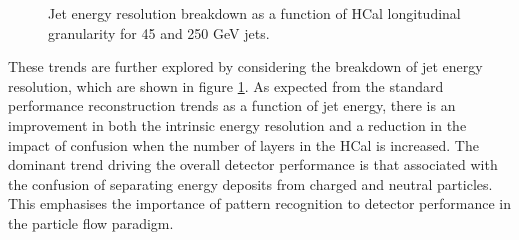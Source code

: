 \begin{figure}
\centering
{}
\caption[Jet energy resolution breakdown as a function of HCal longitudinal granularity for 45 and 250 GeV jets.]{Jet energy resolution breakdown as a function of HCal longitudinal granularity for 45 and 250 GeV jets.}
\label{fig:hcalnlayersbreak}
\end{figure}

These trends are further explored by considering the breakdown of jet energy resolution, which are shown in figure \ref{fig:hcalnlayersbreak}.  As expected from the standard performance reconstruction trends as a function of jet energy, there is an improvement in both the intrinsic energy resolution and a reduction in the impact of confusion when the number of layers in the HCal is increased.  The dominant trend driving the overall detector performance is that associated with the confusion of separating energy deposits from charged and neutral particles.  This emphasises the importance of pattern recognition to detector performance in the particle flow paradigm.    

